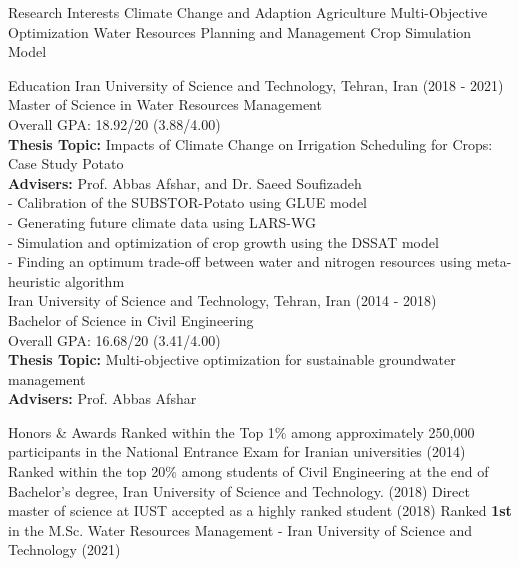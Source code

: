 \documentclass{resume}
\author{Ali Khodagholi}
\begin{document}
\maketitle
\vspace{-0.5cm}
\begin{category}{Research Interests}
\citembullet Climate Change and Adaption Agriculture
\citembullet Multi-Objective Optimization
\citembullet Water Resources Planning and Management
\citembullet Crop Simulation Model
\end{category}
\vspace{0.1cm}
\begin{category}{Education}
\citembullet Iran University of Science and Technology, Tehran, Iran
\hfill
(2018 - 2021)\\
Master of Science in Water Resources Management\\
Overall GPA: {\small 18.92/20 (3.88/4.00)}\\
{\textbf{Thesis Topic:}}
{\small Impacts of Climate Change on Irrigation Scheduling for Crops: Case Study Potato}\\
{\textbf{Advisers:}}
{\small Prof. Abbas Afshar, and Dr. Saeed Soufizadeh}\smallskip\\
- Calibration of the SUBSTOR-Potato using GLUE model\\
- Generating future climate data using LARS-WG\\
- Simulation and optimization of crop growth using the DSSAT model\\
- Finding an optimum trade-off between water and nitrogen resources using meta-heuristic algorithm
\\
\citembullet Iran University of Science and Technology, Tehran, Iran
\hfill
(2014 - 2018)\\
Bachelor of Science in Civil Engineering\\
Overall GPA: {\small 16.68/20 (3.41/4.00)}\\
{\textbf{Thesis Topic:}}
{\small Multi-objective optimization for sustainable groundwater management}\\
{\textbf{Advisers:}}
{\small Prof. Abbas Afshar}
\end{category}
\vspace{0.1cm}
\begin{category} {Honors \& Awards}
\citembullet Ranked within the Top 1\% among approximately 250,000 participants in the National Entrance Exam for Iranian universities
\hfill (2014)
\citembullet Ranked within the top 20\% among students of Civil Engineering at the end of Bachelor's degree, Iran University of Science and Technology.
\hfill (2018)
\citembullet Direct master of science at IUST accepted as a highly ranked student
\hfill (2018)
\citembullet Ranked \textbf{1st} in the M.Sc. Water Resources Management - Iran University of Science and Technology
\hfill (2021)
\end{category}
\end{document}
